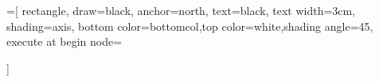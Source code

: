 \usepackage{varwidth}
\usepackage{pgf}

\usetikzlibrary{positioning, arrows, decorations.markings}
\usetikzlibrary{shapes}


\newcommand{\switch}[2]{
    \scalebox{#1}{
        \begin{tikzpicture}
            \node at (0,0) {\texttt{[image: switch.pdf]}};
            \node at (0,-0.6) {#2};
        \end{tikzpicture}
    }
}

=[
    rectangle,
    draw=black,
    anchor=north,
    text=black,
    text width=3cm,
    shading=axis,
    bottom color=bottomcol,top color=white,shading angle=45,
    execute at begin node={\begin{varwidth}{15em}},
    execute at end node={\end{varwidth}}
]

\usepackage{pgfplots}


\newenvironment{customlegend}[1][]{%
    \begingroup
    \csname pgfplots@init@cleared@structures\endcsname
    \pgfplotsset{#1}%
}{%
    \csname pgfplots@createlegend\endcsname
    \endgroup
}%

\def\addlegendimage{\csname pgfplots@addlegendimage\endcsname}
